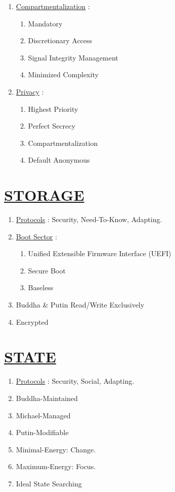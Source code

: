 \documentclass[11pt]{article}
\begin{document}
\begin{enumerate}
\begin{enumerate}
	\end{enumerate}

	\item[] \ul{Compartmentalization} :
	\begin{enumerate}
		\item[] Mandatory
		\item[] Discretionary Access
		\item[] Signal Integrity Management
		\item[] Minimized Complexity
	\end{enumerate}

	\item[] \ul{Privacy} :
	\begin{enumerate}
		\item[] Highest Priority
		\item[] Perfect Secrecy
		\item[] Compartmentalization
		\item[] Default Anonymous
	\end{enumerate}
	
\end{enumerate}


\section*{\ul{STORAGE}}
\begin{enumerate}
	\item[] \ul{Protocols} : Security, Need-To-Know, Adapting.
	
	\item[] \ul{Boot Sector} :
	\begin{enumerate}
		\item[] Unified Extensible Firmware Interface (UEFI)
		\item[] Secure Boot
		\item[] Baseless
	\end{enumerate}
	
	\item[] Buddha \& Putin Read/Write Exclusively
	\item[] Encrypted

\end{enumerate}


\section*{\ul{STATE}}
\begin{enumerate}
	\item[] \ul{Protocols} : Security, Social, Adapting.
	
	\item[] Buddha-Maintained
	\item[] Michael-Managed
	\item[] Putin-Modifiable
	\item[] Minimal-Energy: Change.
	\item[] Maximum-Energy: Focus.
	\item[] Ideal State Searching
	
\end{enumerate}
\end{document}
